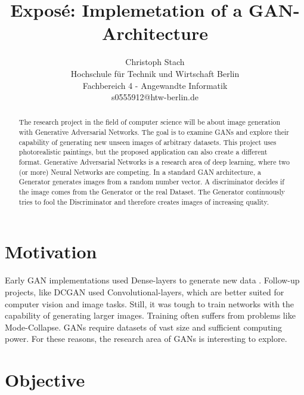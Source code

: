 \documentclass[]{article}
\begin{document}
\title{\textbf{Exposé: Implemetation of a GAN-Architecture}}

\author{
  Christoph Stach\\
  Hochschule für Technik und Wirtschaft Berlin\\
  Fachbereich 4 - Angewandte Informatik\\
  s0555912@htw-berlin.de
}
\maketitle

\begin{abstract}

\noindent
The research project in the field of computer science will be about image generation with Generative Adversarial Networks. The goal is to examine GANs and explore their capability of generating new unseen images of arbitrary datasets. This project uses photorealistic paintings, but the proposed application can also create a different format. Generative Adversarial Networks is a research area of deep learning, where two (or more) Neural Networks are competing. In a standard GAN architecture, a Generator generates images from a random number vector. A discriminator decides if the image comes from the Generator or the real Dataset. The Generator continuously tries to fool the Discriminator and therefore creates images of increasing quality.

\end{abstract}


\section{Motivation}

\noindent
Early GAN implementations used Dense-layers to generate new data \cite{goodfellow2014generative}. Follow-up projects, like DCGAN \cite{radford2016dcgan} used Convolutional-layers, which are better suited for computer vision and image tasks. Still, it was tough to train networks with the capability of generating larger images. Training often suffers from problems like Mode-Collapse. GANs require datasets of vast size and sufficient computing power. For these reasons, the research area of GANs is interesting to explore.

\section{Objective}
\end{document}
